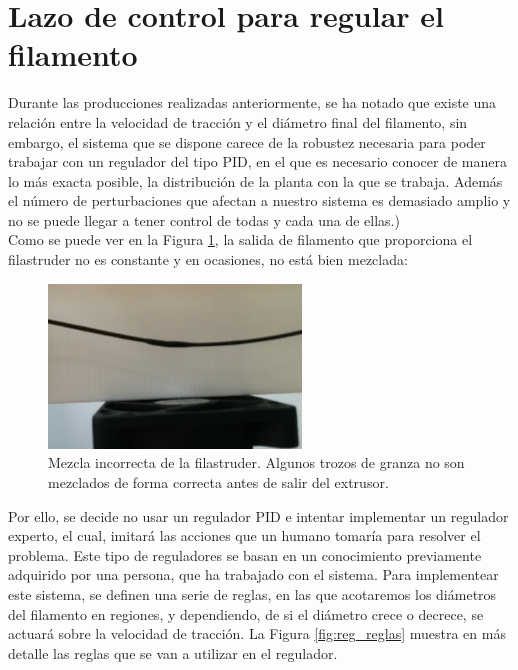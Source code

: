 \section{Lazo de control para regular el filamento}
\label{sec:reg_expt}

Durante las producciones realizadas anteriormente, se ha notado que existe una relación entre la velocidad de tracción y el diámetro final del filamento, sin embargo, el sistema que se dispone carece de la robustez necesaria para poder trabajar con un regulador del tipo PID, en el que es necesario conocer de manera lo más exacta posible, la distribución de la planta con la que se trabaja. Además el número de perturbaciones que afectan a nuestro sistema es demasiado amplio y no se puede llegar a tener control de todas y cada una de ellas.)\\

Como se puede ver en la Figura \ref{fig:reg_mezcla}, la salida de filamento que proporciona el filastruder no es constante y en ocasiones, no está bien mezclada:

\begin{figure}[H]
    \centering
    \includegraphics[width=0.6\textwidth]{images/producciones/22072015/IMG_20150722_120959.jpg}
    \caption[Mezcla incorrecta de la filastruder.]{Mezcla incorrecta de la filastruder. Algunos trozos de granza no son mezclados de forma correcta antes de salir del extrusor.}
    \label{fig:reg_mezcla}
\end{figure}

Por ello, se decide no usar un regulador PID e intentar implementar un regulador experto, el cual, imitará las acciones que un humano tomaría para resolver el problema. Este tipo de reguladores se basan en un conocimiento previamente adquirido por una persona, que ha trabajado con el sistema. Para implementear este sistema, se definen una serie de reglas, en las que acotaremos los diámetros del filamento en regiones, y dependiendo, de si el diámetro crece o decrece, se actuará sobre la velocidad de tracción. La Figura \ref{fig:reg_reglas} muestra en más detalle las reglas que se van a utilizar en el regulador.

